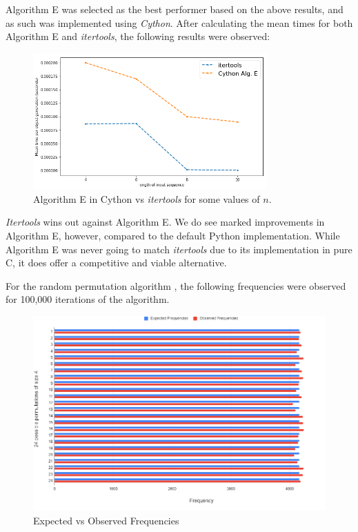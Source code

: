 \documentclass[12pt]{article}
\begin{document}
Algorithm E was selected as the best performer based on the above results, and as such was implemented using \textit{Cython}. After calculating the mean times for both Algorithm E and \textit{itertools}, the following results were observed:

\begin{figure}[h]
\centering
\includegraphics[width=0.8\textwidth]{images/perm_graph2.PNG}
\caption{Algorithm E in Cython vs \textit{itertools} for some values of \(n\).}
\end{figure}

\textit{Itertools} wins out against Algorithm E. We do see marked improvements in Algorithm E, however, compared to the default Python implementation. While Algorithm E was never going to match \textit{itertools} due to its implementation in pure C, it does offer a competitive and viable alternative.

For the random permutation algorithm \cite{rand_perm}, the following frequencies were observed for 100,000 iterations of the algorithm.

\begin{figure}[h]
\centering
\includegraphics[width=1.0\textwidth]{images/perm_freq.PNG}
\caption{Expected vs Observed Frequencies}
\end{figure}
\end{document}
